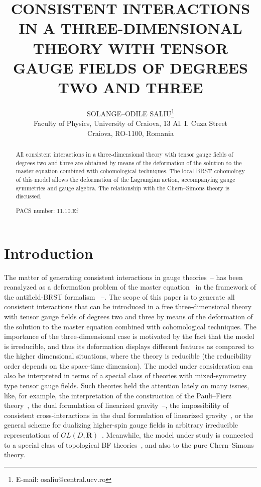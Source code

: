 \documentclass[a4paper,11pt]{article}
\begin{document}
\title{CONSISTENT INTERACTIONS IN A THREE-DIMENSIONAL THEORY WITH TENSOR GAUGE
FIELDS OF DEGREES TWO AND THREE}
\author{SOLANGE--ODILE SALIU\thanks{%
E-mail: osaliu@central.ucv.ro} \\
Faculty of Physics, University of Craiova, 13 Al. I. Cuza Street\\
Craiova, RO-1100, Romania}
\maketitle

\begin{abstract}
All consistent interactions in a three-dimensional theory with tensor gauge
fields of degrees two and three are obtained by means of the deformation of
the solution to the master equation combined with cohomological techniques.
The local BRST cohomology of this model allows the deformation of the
Lagrangian action, accompanying gauge symmetries and gauge algebra. The
relationship with the Chern--Simons theory is discussed.

PACS number: 11.10.Ef
\end{abstract}

\section{Introduction}

The matter of generating consistent interactions in gauge theories~\cite
{alpha1}--\cite{alpha3} has been reanalyzed as a deformation problem of the
master equation~\cite{def} in the framework of the antifield-BRST formalism~%
\cite{1}--\cite{5}. The scope of this paper is to generate all consistent
interactions that can be introduced in a free three-dimensional theory with
tensor gauge fields of degrees two and three by means of the deformation of
the solution to the master equation combined with cohomological techniques.
The importance of the three-dimensional case is motivated by the fact that
the model is irreducible, and thus its deformation displays different
features as compared to the higher dimensional situations, where the theory
is reducible (the reducibility order depends on the space-time dimension).
The model under consideration can also be interpreted in terms of a special
class of theories with mixed-symmetry type tensor gauge fields. Such
theories held the attention lately on many issues, like, for example, the
interpretation of the construction of the Pauli--Fierz theory~\cite{pf}, the
dual formulation of linearized gravity~\cite{dual}--\cite{lingr}, the
impossibility of consistent cross-interactions in the dual formulation of
linearized gravity~\cite{lingr}, or the general scheme for dualizing
higher-spin gauge fields in arbitrary irreducible representations of $GL(D,%
\mathbf{R})$~\cite{gensch}. Meanwhile, the model under study is connected to
a special class of topological BF theories~\cite{topBF}, and also to the
pure Chern--Simons theory.
\end{document}
